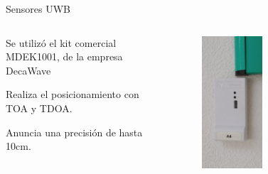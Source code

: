 \documentclass[xcolor=table]{beamer}
\begin{document}
  \begin{frame}{Sensores UWB}
    \begin{columns}
      \begin{column}{0.5\textwidth}
        Se utilizó el kit comercial MDEK1001, de la empresa DecaWave

        \vspace{0.5cm}
        Realiza el posicionamiento con TOA y TDOA.

        \vspace{0.5cm}
        Anuncia una precisión de hasta 10cm.
      \end{column}
      \begin{column}{0.5\textwidth}  
        \begin{figure}[H]
          \centering
          \includegraphics[width=0.45\textwidth]{pic/sensor.jpg}
          \label{fig:robot}
      \end{figure}
      \end{column}
    \end{columns}
  \end{frame}
\end{document}
